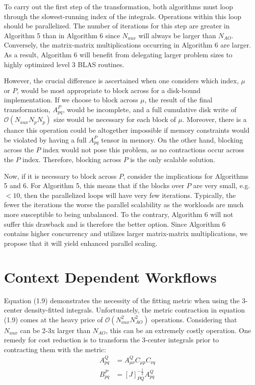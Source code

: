 To carry out the first step of the transformation, both algorithms must loop through the slowest-running index of the integrals.
Operations within this loop should be parallelized.
The number of iterations for this step are greater in Algorithm 5 than in Algorithm 6 since $N_{aux}$ will always be 
larger than $N_{AO}$.
Conversely, the matrix-matrix multiplications occurring in Algorithm 6 are larger. As a result, Algorithm 6 will benefit from delegating
larger problem sizes to highly optimized level 3 BLAS routines. 

However, the crucial difference is ascertained when one considers which index, $\mu$ or $P$, would be most appropriate to block across
for a disk-bound implementation. If we choose to block across $\mu$, the result of the final transformation, $A_{pq}^P$, would be incomplete,
and a full cumulative disk write of $\mathcal{O}(N_{aux}N_pN_p)$ size would be necessary for each block of $\mu$. Moreover, there is a chance
this operation could be altogether impossible if memory constraints would be violated by having a full $A_{pq}^P$ tensor in memory. 
On the other hand, 
blocking across the $P$ index would not pose this problem, as no contractions occur across the $P$ index. Therefore, blocking across 
$P$ is the only scalable solution.

Now, if it is necessary to block across $P$, consider the implications for Algorithms 5 and 6. For Algorithm 5, this means that if the blocks
over $P$ are very small, e.g. $<10$, then the parallelized loops will have very few iterations. Typically, the fewer the iterations the worse
the parallel scalability as the workloads are much more susceptible to being unbalanced. To the contrary, Algorithm 6 will not suffer this 
drawback and is therefore the better option. Since Algorithm 6 contains higher concurrency and utilizes larger matrix-matrix multiplications, 
we propose that it will yield enhanced parallel scaling. 

\section{Context Dependent Workflows}

Equation (1.9) demonstrates the necessity of the fitting metric when using the 3-center density-fitted integrals. Unfortunately, the
metric contraction in equation (1.9) comes at the heavy price of $\mathcal{O}(N_{aux}^2N_{AO}^2)$ operations.
Considering that $N_{aux}$ can be 2-3x larger
than $N_{AO}$, this can be an extremely costly operation. One remedy for cost reduction is to transform the 3-center integrals prior to contracting
them with the metric:
\begin{align} 
A_{p q}^Q &= A_{\mu \nu}^Q C_{\mu p}C_{\nu q} \\
B_{pq}^P &= [J]_{PQ}^{-\frac{1}{2}}A_{p q}^Q
\end{align}
 
